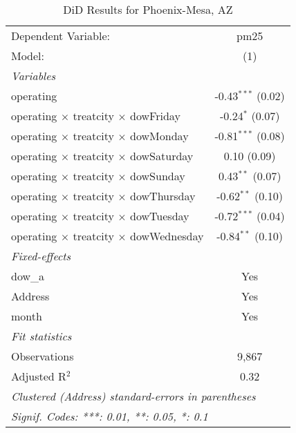 
\begin{table}[htbp]
   \caption{DiD Results for Phoenix-Mesa, AZ}
   \centering
   \begin{tabular}{lc}
      \tabularnewline \midrule \midrule
      Dependent Variable:                                  & pm25\\  
      Model:                                               & (1)\\  
      \midrule
      \emph{Variables}\\
      operating                                            & -0.43$^{***}$ (0.02)\\   
      operating $\times$ treatcity $\times$ dowFriday      & -0.24$^{*}$ (0.07)\\   
      operating $\times$ treatcity $\times$ dowMonday      & -0.81$^{***}$ (0.08)\\   
      operating $\times$ treatcity $\times$ dowSaturday    & 0.10 (0.09)\\   
      operating $\times$ treatcity $\times$ dowSunday      & 0.43$^{**}$ (0.07)\\   
      operating $\times$ treatcity $\times$ dowThursday    & -0.62$^{**}$ (0.10)\\   
      operating $\times$ treatcity $\times$ dowTuesday     & -0.72$^{***}$ (0.04)\\   
      operating $\times$ treatcity $\times$ dowWednesday   & -0.84$^{**}$ (0.10)\\   
      \midrule
      \emph{Fixed-effects}\\
      dow\_a                                               & Yes\\  
      Address                                              & Yes\\  
      month                                                & Yes\\  
      \midrule
      \emph{Fit statistics}\\
      Observations                                         & 9,867\\  
      Adjusted R$^2$                                       & 0.32\\  
      \midrule \midrule
      \multicolumn{2}{l}{\emph{Clustered (Address) standard-errors in parentheses}}\\
      \multicolumn{2}{l}{\emph{Signif. Codes: ***: 0.01, **: 0.05, *: 0.1}}\\
   \end{tabular}
\end{table}


